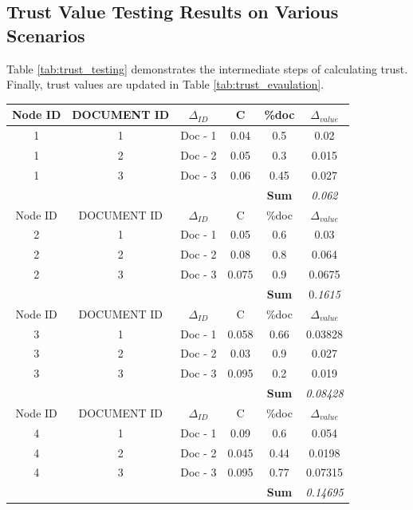 \subsection{Trust Value Testing Results on Various Scenarios}
Table \ref{tab:trust_testing} demonstrates the intermediate steps of calculating
trust. Finally, trust values are updated in Table \ref{tab:trust_evaulation}.
\begin{table}[h!]
    \centering
\begin{tabular}{c | c | c | c | c | c}
    \hline
    Node ID	& DOCUMENT ID	& \( \Delta_{ID} \) 	 & C	& \%doc	& \( \Delta_{value} \) \\
    \hline \hline
1        & 1	&  Doc - 1      & 0.04       & 0.5	& 0.02 \\
1        & 2	&  Doc - 2      & 0.05       & 0.3	& 0.015 \\
1        & 3	&  Doc - 3      & 0.06       & 0.45	& 0.027 \\
\hline
&		&	 	        &            & \textbf{Sum}	& \em{0.062} \\

    \hline
Node ID &	DOCUMENT ID	&  \( \Delta_{ID} \)         & C	& \%doc& \( \Delta_{value} \) \\
\hline \hline
2        &1	  & Doc - 1         & 0.05       & 0.6	& 0.03 \\
2        &2	  & Doc - 2         & 0.08       & 0.8	& 0.064 \\
2        &3	  & Doc - 3         & 0.075      & 0.9	& 0.0675 \\
\hline
&	  &    	            &            & \textbf{Sum}	& 0.\em{1615} \\
    \hline
Node ID &	DOCUMENT ID	&  \( \Delta_{ID} \)         & C	& \%doc	& \(
\Delta_{value} \) \\
\hline \hline
3        &1	  & Doc - 1         & 0.058      & 0.66	& 0.03828 \\
3        &2	  & Doc - 2         & 0.03       & 0.9	& 0.027 \\
3        &3	  & Doc - 3         & 0.095      & 0.2	& 0.019 \\
\hline
& 	  &                 &            & \textbf{Sum}	& \em{0.08428} \\
    \hline
Node ID &	DOCUMENT ID	&  \( \Delta_{ID} \)         & C	& \%doc	 & \(
\Delta_{value} \) \\
\hline \hline
4        &1	  & Doc - 1         & 0.09       & 0.6	& 0.054 \\
4        &2	  & Doc - 2         & 0.045      & 0.44	& 0.0198 \\
4        &3	  & Doc - 3         & 0.095      & 0.77	& 0.07315 \\
\hline
&    &                 &            &	\textbf{Sum}	& \em{0.14695} \\
\end{tabular}


\end{table}
